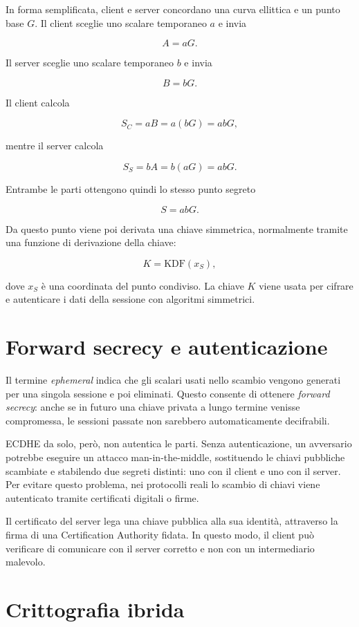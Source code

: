 \documentclass[12pt,a4paper,oneside]{report}
\begin{document}
In forma semplificata, client e server concordano una curva ellittica e un punto base \(G\). Il client sceglie uno scalare temporaneo \(a\) e invia

\[
A=aG.
\]

Il server sceglie uno scalare temporaneo \(b\) e invia

\[
B=bG.
\]

Il client calcola

\[
S_C=aB=a(bG)=abG,
\]

mentre il server calcola

\[
S_S=bA=b(aG)=abG.
\]

Entrambe le parti ottengono quindi lo stesso punto segreto

\[
S=abG.
\]

Da questo punto viene poi derivata una chiave simmetrica, normalmente tramite una funzione di derivazione della chiave:

\[
K=\mathrm{KDF}(x_S),
\]

dove \(x_S\) è una coordinata del punto condiviso. La chiave \(K\) viene usata per cifrare e autenticare i dati della sessione con algoritmi simmetrici.

\section{Forward secrecy e autenticazione}

Il termine \textit{ephemeral} indica che gli scalari usati nello scambio vengono generati per una singola sessione e poi eliminati. Questo consente di ottenere \textit{forward secrecy}: anche se in futuro una chiave privata a lungo termine venisse compromessa, le sessioni passate non sarebbero automaticamente decifrabili.

ECDHE da solo, però, non autentica le parti. Senza autenticazione, un avversario potrebbe eseguire un attacco man-in-the-middle, sostituendo le chiavi pubbliche scambiate e stabilendo due segreti distinti: uno con il client e uno con il server. Per evitare questo problema, nei protocolli reali lo scambio di chiavi viene autenticato tramite certificati digitali o firme.

Il certificato del server lega una chiave pubblica alla sua identità, attraverso la firma di una Certification Authority fidata. In questo modo, il client può verificare di comunicare con il server corretto e non con un intermediario malevolo.

\section{Crittografia ibrida}
\end{document}

